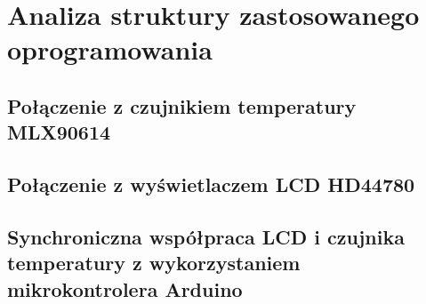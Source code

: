 \chapter{Analiza struktury zastosowanego oprogramowania}
    \section{Połączenie z czujnikiem temperatury MLX90614}
    \section{Połączenie z wyświetlaczem LCD HD44780}
    \section{Synchroniczna współpraca LCD i czujnika temperatury z wykorzystaniem mikrokontrolera Arduino}